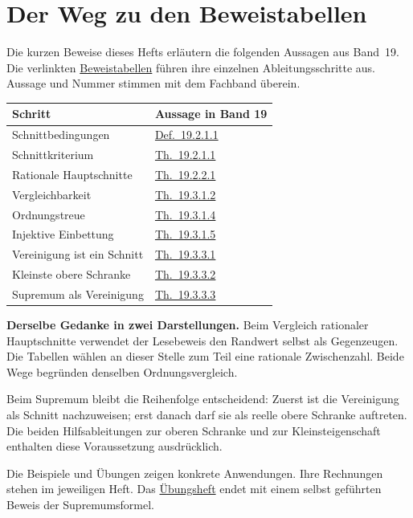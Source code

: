 \clearpage
\section{Der Weg zu den Beweistabellen}
\label{cuts:correspondence}

Die kurzen Beweise dieses Hefts erläutern die folgenden Aussagen aus
Band~19. Die verlinkten \href{_B19-cuts-proofs.pdf\#cuts.proofs}{Beweistabellen}
führen ihre einzelnen Ableitungsschritte aus. Aussage und Nummer stimmen
mit dem Fachband überein.

\begin{center}
\small\renewcommand{\arraystretch}{1.25}
\begin{tabularx}{\linewidth}{@{}Xl@{}}
\toprule
Schritt & Aussage in Band 19\\
\midrule
Schnittbedingungen & \href{_B19-cuts-proofs.pdf\#cuts.proof.DedekindCutPredicate}{Def.~19.2.1.1}\\
Schnittkriterium & \href{_B19-cuts-proofs.pdf\#cuts.proof.DedekindCutCharacterization}{Th.~19.2.1.1}\\
Rationale Hauptschnitte & \href{_B19-cuts-proofs.pdf\#cuts.proof.RealPrincipalCutIsCut}{Th.~19.2.2.1}\\
Vergleichbarkeit & \href{_B19-cuts-proofs.pdf\#cuts.proof.RealCutInclusionComparable}{Th.~19.3.1.2}\\
Ordnungstreue & \href{_B19-cuts-proofs.pdf\#cuts.proof.RationalToRealEmbeddingOrder}{Th.~19.3.1.4}\\
Injektive Einbettung & \href{_B19-cuts-proofs.pdf\#cuts.proof.RationalToRealEmbeddingInjective}{Th.~19.3.1.5}\\
Vereinigung ist ein Schnitt & \href{_B19-cuts-proofs.pdf\#cuts.proof.RealBoundedCutUnionIsCut}{Th.~19.3.3.1}\\
Kleinste obere Schranke & \href{_B19-cuts-proofs.pdf\#cuts.proof.RealLeastUpperBoundProperty}{Th.~19.3.3.2}\\
Supremum als Vereinigung & \href{_B19-cuts-proofs.pdf\#cuts.proof.RealCutSupremumUnion}{Th.~19.3.3.3}\\
\bottomrule
\end{tabularx}
\end{center}

\textbf{Derselbe Gedanke in zwei Darstellungen.}
Beim Vergleich rationaler Hauptschnitte verwendet der Lesebeweis den
Randwert selbst als Gegenzeugen. Die Tabellen wählen an dieser Stelle
zum Teil eine rationale Zwischenzahl. Beide Wege begründen denselben
Ordnungsvergleich.

Beim Supremum bleibt die Reihenfolge entscheidend: Zuerst ist die
Vereinigung als Schnitt nachzuweisen; erst danach darf sie als reelle
obere Schranke auftreten. Die beiden Hilfsableitungen zur oberen Schranke
und zur Kleinsteigenschaft enthalten diese Voraussetzung ausdrücklich.

Die Beispiele und Übungen zeigen konkrete Anwendungen. Ihre Rechnungen
stehen im jeweiligen Heft. Das \href{_B19-cuts-exercises.pdf\#cuts.exercises}{Übungsheft}
endet mit einem selbst geführten Beweis der Supremumsformel.
